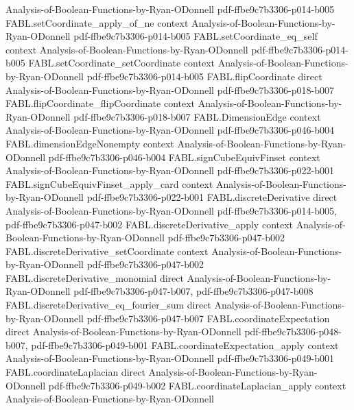 \begin{theorem}
  {Analysis-of-Boolean-Functions-by-Ryan-ODonnell}
  {pdf-ffbe9c7b3306-p014-b005}
\proofstep
  {FABL.setCoordinate_apply_of_ne}
  {context}
  {Analysis-of-Boolean-Functions-by-Ryan-ODonnell}
  {pdf-ffbe9c7b3306-p014-b005}
\proofstep
  {FABL.setCoordinate_eq_self}
  {context}
  {Analysis-of-Boolean-Functions-by-Ryan-ODonnell}
  {pdf-ffbe9c7b3306-p014-b005}
\proofstep
  {FABL.setCoordinate_setCoordinate}
  {context}
  {Analysis-of-Boolean-Functions-by-Ryan-ODonnell}
  {pdf-ffbe9c7b3306-p014-b005}
\proofstep
  {FABL.flipCoordinate}
  {direct}
  {Analysis-of-Boolean-Functions-by-Ryan-ODonnell}
  {pdf-ffbe9c7b3306-p018-b007}
\proofstep
  {FABL.flipCoordinate_flipCoordinate}
  {context}
  {Analysis-of-Boolean-Functions-by-Ryan-ODonnell}
  {pdf-ffbe9c7b3306-p018-b007}
\proofstep
  {FABL.DimensionEdge}
  {context}
  {Analysis-of-Boolean-Functions-by-Ryan-ODonnell}
  {pdf-ffbe9c7b3306-p046-b004}
\proofstep
  {FABL.dimensionEdgeNonempty}
  {context}
  {Analysis-of-Boolean-Functions-by-Ryan-ODonnell}
  {pdf-ffbe9c7b3306-p046-b004}
\proofstep
  {FABL.signCubeEquivFinset}
  {context}
  {Analysis-of-Boolean-Functions-by-Ryan-ODonnell}
  {pdf-ffbe9c7b3306-p022-b001}
\proofstep
  {FABL.signCubeEquivFinset_apply_card}
  {context}
  {Analysis-of-Boolean-Functions-by-Ryan-ODonnell}
  {pdf-ffbe9c7b3306-p022-b001}
\proofstep
  {FABL.discreteDerivative}
  {direct}
  {Analysis-of-Boolean-Functions-by-Ryan-ODonnell}
  {pdf-ffbe9c7b3306-p014-b005,
    pdf-ffbe9c7b3306-p047-b002}
\proofstep
  {FABL.discreteDerivative_apply}
  {context}
  {Analysis-of-Boolean-Functions-by-Ryan-ODonnell}
  {pdf-ffbe9c7b3306-p047-b002}
\proofstep
  {FABL.discreteDerivative_setCoordinate}
  {context}
  {Analysis-of-Boolean-Functions-by-Ryan-ODonnell}
  {pdf-ffbe9c7b3306-p047-b002}
\proofstep
  {FABL.discreteDerivative_monomial}
  {direct}
  {Analysis-of-Boolean-Functions-by-Ryan-ODonnell}
  {pdf-ffbe9c7b3306-p047-b007,
    pdf-ffbe9c7b3306-p047-b008}
\proofstep
  {FABL.discreteDerivative_eq_fourier_sum}
  {direct}
  {Analysis-of-Boolean-Functions-by-Ryan-ODonnell}
  {pdf-ffbe9c7b3306-p047-b007}
\proofstep
  {FABL.coordinateExpectation}
  {direct}
  {Analysis-of-Boolean-Functions-by-Ryan-ODonnell}
  {pdf-ffbe9c7b3306-p048-b007,
    pdf-ffbe9c7b3306-p049-b001}
\proofstep
  {FABL.coordinateExpectation_apply}
  {context}
  {Analysis-of-Boolean-Functions-by-Ryan-ODonnell}
  {pdf-ffbe9c7b3306-p049-b001}
\proofstep
  {FABL.coordinateLaplacian}
  {direct}
  {Analysis-of-Boolean-Functions-by-Ryan-ODonnell}
  {pdf-ffbe9c7b3306-p049-b002}
\proofstep
  {FABL.coordinateLaplacian_apply}
  {context}
  {Analysis-of-Boolean-Functions-by-Ryan-ODonnell}

\end{theorem}
